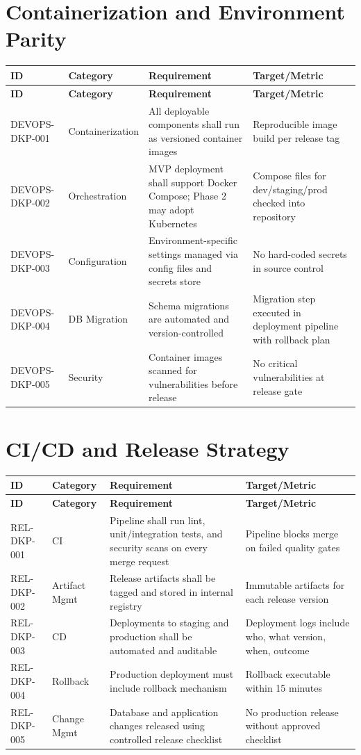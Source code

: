 \documentclass[12pt,a4paper]{report}
\begin{document}
\section{Containerization and Environment Parity}
\begin{longtable}{|p{2.2cm}|p{3.2cm}|p{5.2cm}|p{3.4cm}|}
\hline
\textbf{ID} & \textbf{Category} & \textbf{Requirement} & \textbf{Target/Metric} \\ \hline
\endfirsthead
\hline
\textbf{ID} & \textbf{Category} & \textbf{Requirement} & \textbf{Target/Metric} \\ \hline
\endhead
DEVOPS-DKP-001 & Containerization & All deployable components shall run as versioned container images & Reproducible image build per release tag \\ \hline
DEVOPS-DKP-002 & Orchestration & MVP deployment shall support Docker Compose; Phase 2 may adopt Kubernetes & Compose files for dev/staging/prod checked into repository \\ \hline
DEVOPS-DKP-003 & Configuration & Environment-specific settings managed via config files and secrets store & No hard-coded secrets in source control \\ \hline
DEVOPS-DKP-004 & DB Migration & Schema migrations are automated and version-controlled & Migration step executed in deployment pipeline with rollback plan \\ \hline
DEVOPS-DKP-005 & Security & Container images scanned for vulnerabilities before release & No critical vulnerabilities at release gate \\ \hline
\end{longtable}

\section{CI/CD and Release Strategy}
\begin{longtable}{|p{2.2cm}|p{3.2cm}|p{5.2cm}|p{3.4cm}|}
\hline
\textbf{ID} & \textbf{Category} & \textbf{Requirement} & \textbf{Target/Metric} \\ \hline
\endfirsthead
\hline
\textbf{ID} & \textbf{Category} & \textbf{Requirement} & \textbf{Target/Metric} \\ \hline
\endhead
REL-DKP-001 & CI & Pipeline shall run lint, unit/integration tests, and security scans on every merge request & Pipeline blocks merge on failed quality gates \\ \hline
REL-DKP-002 & Artifact Mgmt & Release artifacts shall be tagged and stored in internal registry & Immutable artifacts for each release version \\ \hline
REL-DKP-003 & CD & Deployments to staging and production shall be automated and auditable & Deployment logs include who, what version, when, outcome \\ \hline
REL-DKP-004 & Rollback & Production deployment must include rollback mechanism & Rollback executable within 15 minutes \\ \hline
REL-DKP-005 & Change Mgmt & Database and application changes released using controlled release checklist & No production release without approved checklist \\ \hline
\end{longtable}
\end{document}
